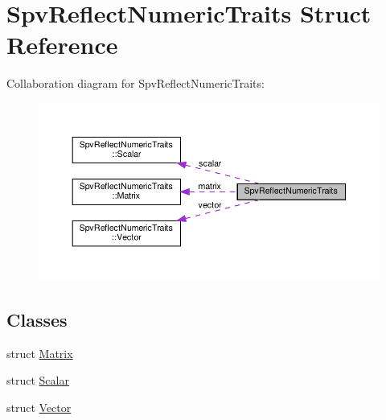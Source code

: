 \hypertarget{structSpvReflectNumericTraits}{}\section{Spv\+Reflect\+Numeric\+Traits Struct Reference}
\label{structSpvReflectNumericTraits}


Collaboration diagram for Spv\+Reflect\+Numeric\+Traits\+:\nopagebreak
\begin{figure}[H]
\begin{center}
\leavevmode
\includegraphics[width=350pt]{structSpvReflectNumericTraits__coll__graph}
\end{center}
\end{figure}
\subsection*{Classes}
\begin{DoxyCompactItemize}
\item 
struct \hyperlink{structSpvReflectNumericTraits_1_1Matrix}{Matrix}
\item 
struct \hyperlink{structSpvReflectNumericTraits_1_1Scalar}{Scalar}
\item 
struct \hyperlink{structSpvReflectNumericTraits_1_1Vector}{Vector}
\end{DoxyCompactItemize}
